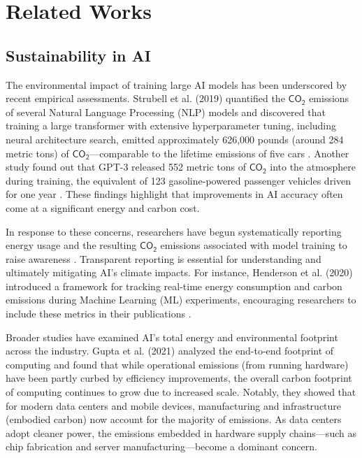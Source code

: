\documentclass[a4paper,singleside,12pt]{report} %
\begin{document}
\chapter{Related Works}

\section{Sustainability in AI}

The environmental impact of training large AI models has been underscored by recent empirical assessments. Strubell et al. (2019)
quantified the $\mathsf{CO_2}$ emissions of several Natural Language Processing (NLP) models and discovered that training a large
transformer with extensive hyperparameter tuning, including neural architecture search, emitted approximately 626,000 pounds 
(around 284 metric tons) of $\mathsf{CO_2}$—comparable to the lifetime emissions of five cars \cite{strubell2019energy}. 
Another study found out that GPT-3 released 552 metric tons of $\mathsf{CO_2}$ into the atmosphere during training, the 
equivalent of 123 gasoline-powered passenger vehicles driven for one year \cite{patterson2021carbon}. These findings highlight that 
improvements in AI accuracy often come at a significant energy and carbon cost.

In response to these concerns, researchers have begun systematically reporting energy usage and the resulting $\mathsf{CO_2}$ 
emissions associated with model training to raise awareness \cite{dodge2022carbon, patterson2021carbon}. Transparent reporting 
is essential for understanding and ultimately mitigating AI's climate impacts. For instance, Henderson et al. (2020) introduced 
a framework for tracking real-time energy consumption and carbon emissions during Machine Learning (ML) experiments, encouraging 
researchers to include these metrics in their publications \cite{henderson2020carbon}.

Broader studies have examined AI's total energy and environmental footprint across the industry. Gupta et al. (2021) analyzed 
the end-to-end footprint of computing and found that while operational emissions (from running hardware) have been partly curbed 
by efficiency improvements, the overall carbon footprint of computing continues to grow due to increased scale. Notably, they 
showed that for modern data centers and mobile devices, manufacturing and infrastructure (embodied carbon) now account for the 
majority of emissions. As data centers adopt cleaner power, the emissions embedded in hardware supply chains—such as chip 
fabrication and server manufacturing—become a dominant concern. \cite{gupta2020carbon}
\end{document}

